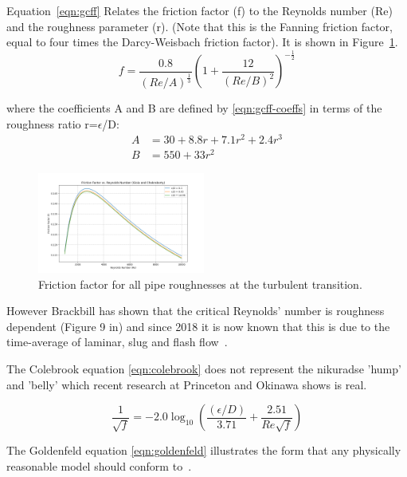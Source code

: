 \documentclass[5p]{elsarticle} %
\begin{document}
Equation~\eqref{eqn:gcff} Relates the friction factor (f) to the Reynolds number (Re) and the roughness parameter (r)\citep{Gioia2006}. (Note that this is the Fanning friction factor, equal to four times the Darcy-Weisbach friction factor). It is shown in Figure~\ref{fig:gioia}.
\begin{equation}
\label{eqn:gcff}
f = \frac{0.8}{\left(Re/A \right)^{\frac{1}{3}}} \left( 1 + \frac{12}{\left(Re/B \right)^2} \right)^{-\frac{1}{2}}
\end{equation}

where the coefficients A and B are defined by \eqref{eqn:gcff-coeffs} in terms of the roughness ratio r=$\epsilon$/D:
\begin{equation}
\label{eqn:gcff-coeffs}
\begin{split}
A & = 30 + 8.8 r + 7.1 r^2 + 2.4 r^3 \\
B & = 550 + 33 r^2
\end{split}
\end{equation}


\begin{figure}[ht]
\centering
\includegraphics[width=0.49\textwidth]{gcff.png}
\caption{Friction factor for all pipe roughnesses at the turbulent transition.}
\label{fig:gioia}
\end{figure}

However  Brackbill has shown that the critical Reynolds' number is roughness dependent (Figure 9 in\citep{Brackbill2007}) and since 2018 it is now known that this is due to the time-average of laminar, slug and flash flow~\cite{Cerbus2018}.

The Colebrook equation \eqref{eqn:colebrook} does not represent the nikuradse 'hump' and 'belly' which recent research at Princeton and Okinawa shows is real.

\begin{equation}
\label{eqn:colebrook}
\frac{1}{\sqrt{f}} = -2.0 \log_{10} \left( \frac{(\epsilon/D)}{3.71} + \frac{2.51}{Re\sqrt{f}} \right)
\end{equation}

The Goldenfeld equation \eqref{eqn:goldenfeld} illustrates the form that any physically reasonable model should conform to~\cite{Goldenfeld2006}.
\end{document}
